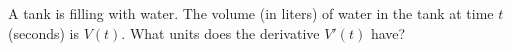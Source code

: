 A tank is filling with water.  The volume (in liters) of water in
the tank at time $t$ (seconds) is $V(t)$.  What units does the
derivative $V'(t)$ have?

